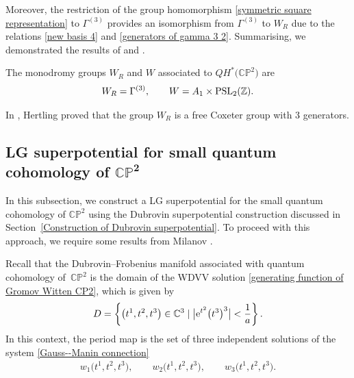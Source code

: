  Moreover, the restriction of the group homomorphism \eqref{symmetric square representation} to $\Gamma^{(3)}$ provides an isomorphism from $\Gamma^{(3)}$ to $W_R$ due to the relations \eqref{new basis 4} and \eqref{generators of gamma 3 2}. Summarising, we demonstrated the results of \cite[Section~4.1]{Milanov} and \cite[Theorem~5.5]{B.Dubrovin3}.

 \begin{Lemma}\label{Monodromy QHCP2}
 The monodromy groups $W_R$ and $W$ associated to $QH^{*}\bigl(\mathbb{CP}^2\bigr)$ are
 \begin{gather*}
 W_R=\Gamma^{(3)}, \qquad W=A_1\times {\rm PSL}_2(\mathbb{Z}).
 \end{gather*}
\end{Lemma}

\begin{Remark}
In \cite[Theorem 5.12\,(g)]{Hertling2}, Hertling proved that the group $W_R$ is a free Coxeter group with 3 generators.
\end{Remark}

\subsection[LG superpotential for small quantum cohomology of $\mathbb{CP}^2$]{LG superpotential for small quantum cohomology of $\boldsymbol{\mathbb{CP}^2}$}\label{LG superpotential for small Quantum Cohomology}

In this subsection, we construct a LG superpotential for the small quantum cohomology of $\mathbb{CP}^2$ using the Dubrovin superpotential construction discussed in Section~\ref{Construction of Dubrovin superpotential}. To proceed with this approach, we require some results from Milanov \cite[Section~4]{Milanov}.


 Recall that the Dubrovin--Frobenius manifold associated with quantum cohomology of~$\mathbb{CP}^2$ is the domain of the WDVV solution \eqref{generating function of Gromov Witten CP2}, which is given by
 \begin{gather}\label{domain Quantum cohomology 1}
 D=\left\{ \bigl(t^1,t^2,t^3\bigr)\in \mathbb{C}^3\mid \bigl|{\rm e}^{t^2}\bigl(t^3\bigr)^3\bigr|<\frac{1}{a}\right\}.
 \end{gather}
 In this context, the period map is the set of three independent solutions of the system \eqref{Gauss--Manin connection}
\begin{gather}\label{period of quantum cohomology cp2}
w_1\bigl(t^1,t^2,t^3\bigr), \qquad w_2\bigl(t^1,t^2,t^3\bigr), \qquad w_3\bigl(t^1,t^2,t^3\bigr).
\end{gather}

